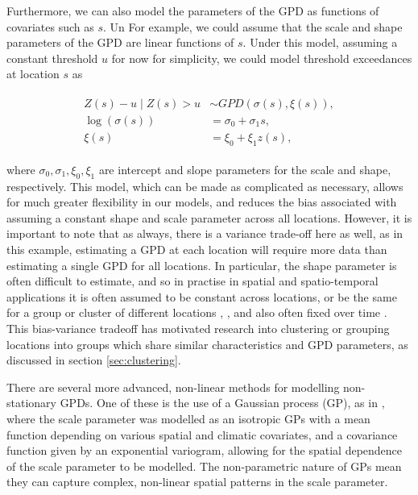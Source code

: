 \documentclass{article}
\numberwithin{equation}{section}
\begin{document}
Furthermore, we can also model the parameters of the GPD as functions of covariates such as $s$.
Un
For example, we could assume that the scale and shape parameters of the GPD are linear functions of $s$.
Under this model, assuming a constant threshold $u$ for now for simplicity, we could model threshold exceedances at location $s$ as 
\begin{centre}
  \begin{align} \label{eq:non_stationary_gpd}
    \begin{split}
      Z(s) - u \mid Z(s) > u    &\sim GPD(\sigma(s), \xi(s)), \\
                \log(\sigma(s)) &= \sigma_0 + \sigma_1 s, \\
                         \xi(s) &= \xi_0 + \xi_1 z(s),
    \end{split}
  \end{align}
\end{centre}
where $\sigma_0, \sigma_1, \xi_0, \xi_1$ are intercept and slope parameters for the scale and shape, respectively.
This model, which can be made as complicated as necessary, allows for much greater flexibility in our models, and reduces the bias associated with assuming a constant shape and scale parameter across all locations.
However, it is important to note that as always, there is a variance trade-off here as well, as in this example, estimating a GPD at each location will require more data than estimating a single GPD for all locations.
In particular, the shape parameter is often difficult to estimate, and so in practise in spatial and spatio-temporal applications it is often assumed to be constant across locations, or be the same for a group or cluster of different locations \cite{Cooley2007}, \cite{Rohrbeck2021}, and also often fixed over time \cite{Risser2019} \cite{Zhang2024}. 
This bias-variance tradeoff has motivated research into clustering or grouping locations into groups which share similar characteristics and GPD parameters, as discussed in section \ref{sec:clustering}.

There are several more advanced, non-linear methods for modelling non-stationary GPDs.
One of these is the use of a Gaussian process (GP), as in \cite{Cooley2007}, where the scale parameter was modelled as an isotropic GPs with a mean function depending on various spatial and climatic covariates, and a covariance function given by an exponential variogram, allowing for the spatial dependence of the scale parameter to be modelled.
The non-parametric nature of GPs mean they can capture complex, non-linear spatial patterns in the scale parameter.
\end{document}
